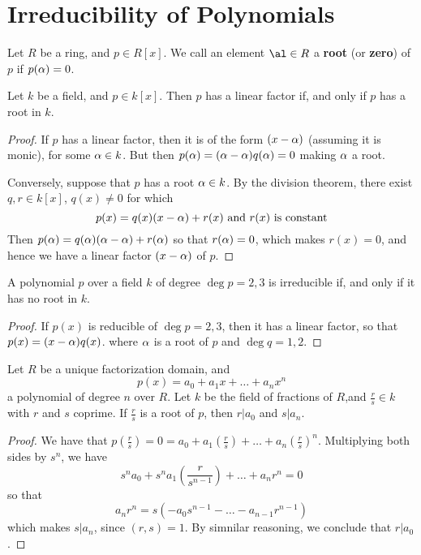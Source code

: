 \section{Irreducibility of Polynomials}
\label{section_7.3}

\begin{definition}
    Let $R$ be a ring, and  $p \in R[x]$. We call an element $\al \in R$ a
    \textbf{root} (or \textbf{zero}) of $p$ if  $p(\alpha)=0$.
\end{definition}

\begin{lemma}\label{lemma_7.3.1}
    Let $k$ be a field, and  $p \in k[x]$. Then $p$ has a linear factor if, and
    only if  $p$ has a root in  $k$.
\end{lemma}
\begin{proof}
    If $p$ has a linear factor, then it is of the form  $(x-\alpha)$ (assuming it is
    monic), for some $\alpha \in k$. But then  $p(\alpha)=(\alpha-\alpha)q(\alpha)=0$ making $\alpha$ a
    root.

    Conversely, suppose that $p$ has a root  $\alpha \in k$. By the division
    theorem, there exist $q, r \in k[x]$, $q(x) \neq 0$ for which
    \begin{equation*}
        p(x)=q(x)(x-\alpha)+r(x) \text{ and } r(x) \text{ is constant}
    \end{equation*}
    Then $p(\alpha)=q(\alpha)(\alpha-\alpha)+r(\alpha)$ so that $r(\alpha)=0$, which makes $r(x)=0$, and
    hence we have a linear factor $(x-\alpha)$ of $p$.
\end{proof}
\begin{corollary}
    A polynomial $p$ over a field $k$ of degree $\deg{p}=2,3$ is irreducible if,
    and only if it has no root in $k$.
\end{corollary}
\begin{proof}
  If $p(x)$ is reducible of $\deg{p}=2,3$, then it has a linear
  factor, so that $p(x)=(x-\alpha)q(x)$. where $\alpha$ is a root of $p$ and
  $\deg{q}=1,2$.
\end{proof}

\begin{lemma}\label{lemma_7.3.2}
    Let $R$ be a unique factorization domain, and
    \begin{equation*}
        p(x)=a_0+a_1x+\dots+a_nx^n
    \end{equation*}
    a polynomial of degree $n$ over $R$. Let $k$ be the field of fractions of
    $R$,and $\frac{r}{s} \in k$ with $r$ and $s$ coprime. If $\frac{r}{s}$ is a
    root of $p$, then  $r|a_0$ and $s|a_n$.
\end{lemma}
\begin{proof}
    We have that
    $p(\frac{r}{s})=0=a_0+a_1(\frac{r}{s})+\dots+a_n(\frac{r}{s})^n$.
    Multiplying both sides by $s^n$, we have
    \begin{equation*}
        s^na_0+s^na_1(\frac{r}{s^{n-1}})+\dots+a_nr^n=0
    \end{equation*}
    so that
    \begin{equation*}
        a_nr^n=s(-a_0s^{n-1}- \dots -a_{n-1}r^{n-1})
    \end{equation*}
    which makes $s|a_n$, since $(r,s)=1$. By simnilar reasoning, we conclude that
    $r|a_0$.
\end{proof}


